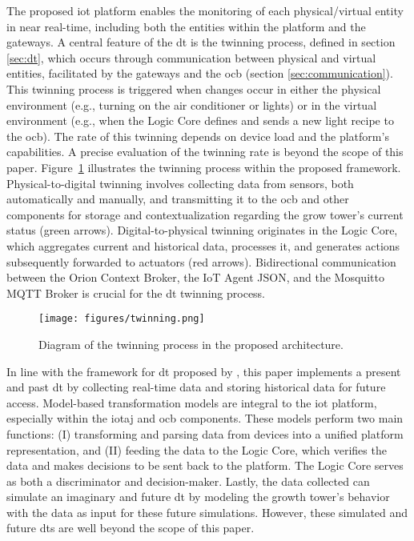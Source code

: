 \documentclass[preprint, review, 12pt]{elsarticle}
\begin{document}
The proposed \gls{iot} platform enables the monitoring of each physical/virtual entity in near real-time, including both the entities within the platform and the gateways. A central feature of the \gls{dt} is the twinning process, defined in section \ref{sec:dt}, which occurs through communication between physical and virtual entities, facilitated by the gateways and the \gls{ocb} (section \ref{sec:communication}). This twinning process is triggered when changes occur in either the physical environment (e.g., turning on the air conditioner or lights) or in the virtual environment (e.g., when the Logic Core defines and sends a new light recipe to the \gls{ocb}). The rate of this twinning depends on device load and the platform’s capabilities. A precise evaluation of the twinning rate is beyond the scope of this paper. Figure~\ref{fig:twinning-process} illustrates the twinning process within the proposed framework. Physical-to-digital twinning involves collecting data from sensors, both automatically and manually, and transmitting it to the \gls{ocb} and other components for storage and contextualization regarding the grow tower's current status (green arrows). Digital-to-physical twinning originates in the Logic Core, which aggregates current and historical data, processes it, and generates actions subsequently forwarded to actuators (red arrows). Bidirectional communication between the Orion Context Broker, the IoT Agent JSON, and the Mosquitto MQTT Broker is crucial for the \gls{dt} twinning process.

\begin{figure}
    \centering
    \texttt{[image: figures/twinning.png]}
    \caption{Diagram of the twinning process in the proposed architecture.}
    \label{fig:twinning-process}
\end{figure}

In line with the framework for \gls{dt} proposed by \cite{verdouw2021}, this paper implements a present and past \gls{dt} by collecting real-time data and storing historical data for future access. Model-based transformation models are integral to the \gls{iot} platform, especially within the \gls{iotaj} and \gls{ocb} components. These models perform two main functions: (I) transforming and parsing data from devices into a unified platform representation, and (II) feeding the data to the Logic Core, which verifies the data and makes decisions to be sent back to the platform. The Logic Core serves as both a discriminator and decision-maker. Lastly, the data collected can simulate an imaginary and future \gls{dt} by modeling the growth tower's behavior with the data as input for these future simulations. However, these simulated and future \gls{dt}s are well beyond the scope of this paper.
\end{document}
